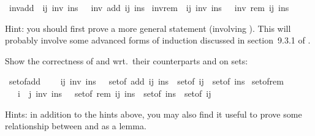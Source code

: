 \begin{isabellebody}
\ inv{\isacharunderscore}add{\isacharcolon}\ {\isachardoublequote}{\isasymlbrakk}\ i{\isasymle}j{\isacharsemicolon}\ inv\ ins\ {\isasymrbrakk}\ {\isasymLongrightarrow}\ inv\ {\isacharparenleft}add\ {\isacharparenleft}i{\isacharcomma}j{\isacharparenright}\ ins{\isacharparenright}{\isachardoublequote}\isamarkupfalse%
\isanewline
\isamarkupfalse%
\ inv{\isacharunderscore}rem{\isacharcolon}\ {\isachardoublequote}{\isasymlbrakk}\ i{\isasymle}j{\isacharsemicolon}\ inv\ ins\ {\isasymrbrakk}\ {\isasymLongrightarrow}\ inv\ {\isacharparenleft}rem\ {\isacharparenleft}i{\isacharcomma}j{\isacharparenright}\ ins{\isacharparenright}{\isachardoublequote}\isamarkupfalse%
\isamarkupfalse%
%
\begin{isamarkuptext}%
Hint: you should first prove a more general statement
(involving ). This will probably involve some advanced
forms of induction discussed in section~9.3.1 of
\cite{isabelle-tutorial}.%
\end{isamarkuptext}%
\isamarkuptrue%
%
\isamarkuptrue%
%
\begin{isamarkuptext}%
Show the correctness of  and  wrt.\
their counterparts \isa{{\isasymunion}} and \isa{{\isacharminus}} on sets:%
\end{isamarkuptext}%
\isamarkuptrue%
\ set{\isacharunderscore}of{\isacharunderscore}add{\isacharcolon}\ \isanewline
\ \ {\isachardoublequote}{\isasymlbrakk}\ i{\isasymle}j{\isacharsemicolon}\ inv\ ins\ {\isasymrbrakk}\ {\isasymLongrightarrow}\ set{\isacharunderscore}of\ {\isacharparenleft}add\ {\isacharparenleft}i{\isacharcomma}j{\isacharparenright}\ ins{\isacharparenright}\ {\isacharequal}\ set{\isacharunderscore}of\ {\isacharbrackleft}{\isacharparenleft}i{\isacharcomma}j{\isacharparenright}{\isacharbrackright}\ {\isasymunion}\ set{\isacharunderscore}of\ ins{\isachardoublequote}\isamarkupfalse%
\isanewline
\isamarkupfalse%
\ set{\isacharunderscore}of{\isacharunderscore}rem{\isacharcolon}\isanewline
\ \ {\isachardoublequote}{\isasymlbrakk}\ i\ {\isasymle}\ j{\isacharsemicolon}\ inv\ ins\ {\isasymrbrakk}\ {\isasymLongrightarrow}\ set{\isacharunderscore}of\ {\isacharparenleft}rem\ {\isacharparenleft}i{\isacharcomma}j{\isacharparenright}\ ins{\isacharparenright}\ {\isacharequal}\ set{\isacharunderscore}of\ ins\ {\isacharminus}\ set{\isacharunderscore}of\ {\isacharbrackleft}{\isacharparenleft}i{\isacharcomma}j{\isacharparenright}{\isacharbrackright}{\isachardoublequote}\isamarkupfalse%
\isamarkupfalse%
%
\begin{isamarkuptext}%
Hints: in addition to the hints above, you may also find it
useful to prove some relationship between  and  as a lemma.%
\end{isamarkuptext}%
\isamarkuptrue%
%
\isamarkuptrue%
%
\begin{isamarkuptext}%
\begin{itemize}


\end{itemize}
\end{isamarkuptext}
\end{isabellebody}
